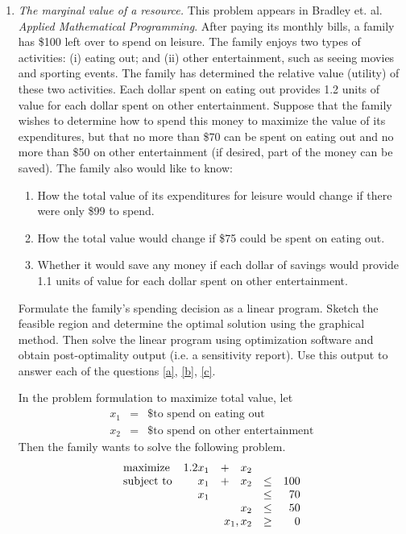 \begin{enumerate}
\item \emph{The marginal value of a resource.}
This problem appears in Bradley et. al. \emph{Applied Mathematical
  Programming}.
After paying its monthly bills, a family has \$100
left over to spend on leisure. The family enjoys two types of
activities: (i) eating out; and (ii) other entertainment, such as
seeing movies and sporting events. The family has determined the
relative value (utility) of these two activities. Each dollar spent on
eating out provides 1.2 units of value for each dollar spent on other
entertainment. Suppose that the family wishes to determine how to
spend this money to maximize the value of its expenditures, but that
no more than \$70 can be spent on eating out and no more than \$50 on
other entertainment (if desired, part of the money can be saved). The
family also would like to know:
\begin{enumerate}
\item How the total value of its expenditures for leisure would change
  if there were only \$99 to spend. \label{a}
\item How the total value would change if \$75 could be spent on
  eating out.\label{b}
\item Whether it would save any money if each dollar of savings would
  provide 1.1 units of value for each dollar spent on other
  entertainment.\label{c}
\end{enumerate}
Formulate the family's spending decision as a linear program. Sketch
the feasible region and determine the optimal solution using the
graphical method.  Then solve the linear program using optimization
software and obtain post-optimality output (i.e. a sensitivity
report).  Use this output to answer each of the questions \ref{a},
\ref{b}, \ref{c}.

\begin{solution}
\bs
In the problem formulation to maximize total value, let
\[
  \begin{array}{lcl}
    x_1 &=& \textrm{\$ to spend on eating out} \\
    x_2 &=& \textrm{\$ to spend on other entertainment}
  \end{array}
\]
Then the family wants to solve the following problem.
\[
\begin{array}{lrrrrr}
\textrm{maximize}   & 1.2x_1& +& x_2&      &   \\
\textrm{subject to} & x_1& +&x_2& \leq & 100 \\
                    & x_1& & & \leq & 70 \\
                    & & & x_2& \leq & 50 \\
\multicolumn{4}{r}{x_1,x_2}&       \geq & 0
\end{array}
\]


\end{solution}
\end{enumerate}
